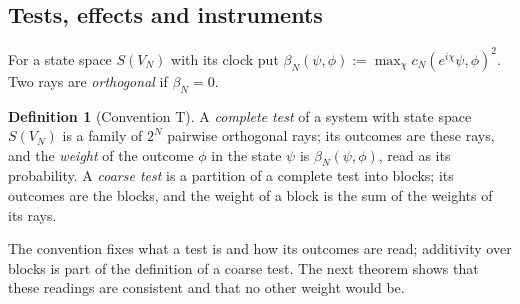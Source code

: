 \documentclass[aps,pra,onecolumn,superscriptaddress,nofootinbib,10pt]{revtex4-2}
\theoremstyle{definition}
\newtheorem{definition}[theorem]{Definition}
\theoremstyle{remark}
\begin{document}
\subsection{Tests, effects and instruments}
For a state space $S(V_N)$ with its clock put
$\beta_N(\psi,\phi):=\max_\chi c_N(e^{i\chi}\psi,\phi)^2$.  Two rays are \emph{orthogonal} if
$\beta_N=0$.

\begin{definition}[Convention T]\label{conv:T}
A \emph{complete test} of a system with state space $S(V_N)$ is a family of $2^N$ pairwise orthogonal
rays; its outcomes are these rays, and the \emph{weight} of the outcome $\phi$ in the state $\psi$ is
$\beta_N(\psi,\phi)$, read as its probability.  A \emph{coarse test} is a partition of a complete test
into blocks; its outcomes are the blocks, and the weight of a block is the sum of the weights of its
rays.
\end{definition}
The convention fixes what a test is and how its outcomes are read; additivity over blocks is part of
the definition of a coarse test.  The next theorem shows that these readings are consistent and that
no other weight would be.
\end{document}
